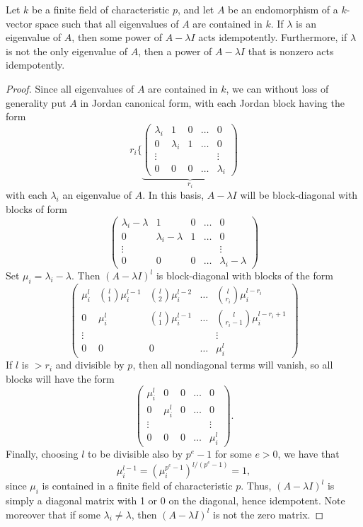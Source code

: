 \documentclass{article}
\let\l\lambda
\numberwithin{equation}{section}
\theoremstyle{theorem}
\numberwithin{thm}{section}
\theoremstyle{definition}
\begin{document}
\begin{lem}
  Let $k$ be a finite field of characteristic $p$, and let $A$ be an endomorphism of a $k$-vector space such that all eigenvalues of $A$ are contained in $k$. If $\l$ is an eigenvalue of $A$, then some power of $A-\l I$ acts idempotently.
Furthermore, if $\l$ is not the only eigenvalue of $A$, then a power of $A-\l I$ that is nonzero acts idempotently.
\end{lem}
\begin{proof}
  Since all eigenvalues of $A$ are contained in $k$, we can without loss of generality put $A$ in Jordan canonical form, with each Jordan block having the form
  \[ r_i\Biggl\{
  \underbrace{\begin{pmatrix}
      \l_i & 1 & 0 & \dots & 0 \\
      0 & \l_i & 1  & \dots & 0 \\
      \vdots & & & & \vdots \\
      0 & 0 & 0 & \dots & \l_i
  \end{pmatrix}}_{r_i} \]
  with each $\l_i$ an eigenvalue of $A$.
  In this basis, $A-\l I$ will be block-diagonal with blocks of form
  \[ \begin{pmatrix}
    \l_i-\l & 1 & 0 & \dots & 0 \\
    0 & \l_i-\l & 1 & \dots & 0 \\
    \vdots & & & & \vdots \\
    0 & 0 & 0 & \dots & \l_i-\l
  \end{pmatrix} \]
  Set $\mu_i=\l_i-\l$. Then $(A-\l I)^l$ is block-diagonal with blocks of the form
  \[ \begin{pmatrix}
    \mu_i^l & \binom{l}1\mu_i^{l-1} & \binom{l}2\mu_i^{l-2} & \dots & \binom{l}{r_i}\mu_i^{l-r_i} \\
    0 & \mu_i^l & \binom{l}1\mu_i^{l-1} & \dots & \binom{l}{r_i-1}\mu_i^{l-r_i+1} \\
    \vdots & & & & \vdots \\
    0 & 0 & 0 & \dots & \mu_i^l
  \end{pmatrix} \]
  If $l$ is $> r_i$ and divisible by $p$, then all nondiagonal terms will vanish, so all blocks will have the form
  \[ \begin{pmatrix}
    \mu_i^l & 0 & 0 & \dots & 0 \\
    0 & \mu_i^l & 0 & \dots & 0 \\
    \vdots & & & & \vdots \\
    0 & 0 & 0 & \dots & \mu_i^l
  \end{pmatrix}. \]
  Finally, choosing $l$ to be divisible also by $p^e-1$ for some $e>0$, we have that $$\mu_i^{l-1} = (\mu_i^{p^{e}-1})^{l/(p^{e}-1)} =1,$$ since $\mu_i$ is contained in a finite field of characteristic $p$.
  Thus, $(A-\l I)^l$ is simply a diagonal matrix with 1 or 0 on the diagonal, hence idempotent. Note moreover that if some $\l_i\neq \l$, then $(A-\l I)^l$ is not the zero matrix.
\end{proof}
\end{document}
